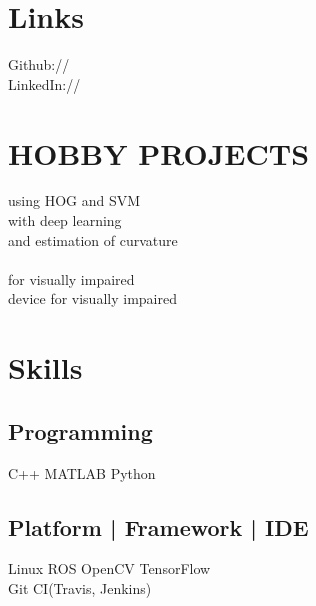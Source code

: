 \documentclass[]{resume-openfont}
\begin{document}
\begin{minipage}[t]{0.36\textwidth}

\section{Links} 
Github:// \href{https://github.com/tusharchugh}{} \\
LinkedIn://  \href{https://www.linkedin.com/in/tusharchugh}{} \\
\sectionsep


\section{HOBBY PROJECTS}
\href{https://github.com/TusharChugh/Vehicle-Detection-HOG}{} using HOG and SVM  \\
\href{https://github.com/TusharChugh/CarND-Behavioral-Cloning-P3} {} with deep learning \\
\href{https://github.com/TusharChugh/LaneFinding}{} and estimation of curvature \\
\href{https://drive.google.com/file/d/102fWGKxSgXCAuf71lqbMsWB5CRU4Gg99/view?usp=sharing}{} \\
\href{https://github.com/TusharChugh/SmartCap}{} for visually impaired \\
\href{https://www.youtube.com/watch?v=F2xGf-Cr6nI}{} device for visually impaired \\

\sectionsep
\section{Skills}
\subsection{Programming}
C++ \textbullet{} MATLAB \textbullet{} Python \\
\sectionsep
\subsection{Platform | Framework | IDE}
Linux \textbullet{} ROS \textbullet{} OpenCV \textbullet{} TensorFlow\\
Git \textbullet{} CI(Travis, Jenkins)
\sectionsep


\end{minipage}
\end{document}
